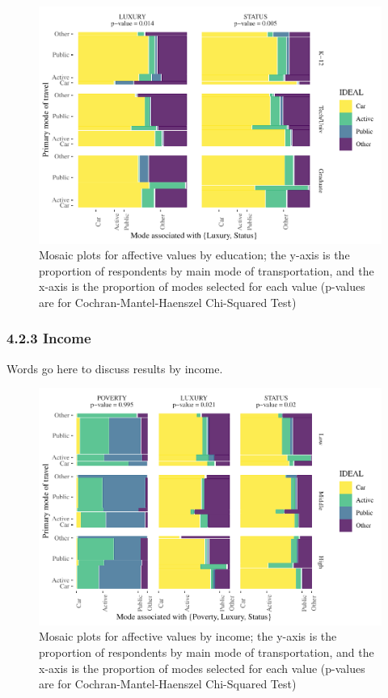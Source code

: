 \documentclass[]{elsarticle} %
\makeatletter
\def\maxwidth{\ifdim\Gin@nat@width>\linewidth\linewidth
\else\Gin@nat@width\fi}
\let\Oldincludegraphics\includegraphics
\renewcommand{\includegraphics}[1]{\Oldincludegraphics[width=\maxwidth]{#1}}
\makeatother
\begin{document}
\begin{figure}
\centering
\includegraphics{Dissonance_Santiago_v1_files/figure-latex/figure-mosaic-plots-by-attribute-and-education-1.pdf}
\caption{\label{fig:mosaic-plots-by-education}Mosaic plots for affective
values by education; the y-axis is the proportion of respondents by main
mode of transportation, and the x-axis is the proportion of modes
selected for each value (p-values are for Cochran-Mantel-Haenszel
Chi-Squared Test)}
\end{figure}

\hypertarget{income-1}{%
\subsubsection{4.2.3 Income}\label{income-1}}

Words go here to discuss results by income.

\begin{figure}
\centering
\includegraphics{Dissonance_Santiago_v1_files/figure-latex/figure-mosaic-plots-by-attribute-and-income-1.pdf}
\caption{\label{fig:mosaic-plots-by-income}Mosaic plots for affective
values by income; the y-axis is the proportion of respondents by main
mode of transportation, and the x-axis is the proportion of modes
selected for each value (p-values are for Cochran-Mantel-Haenszel
Chi-Squared Test)}
\end{figure}
\end{document}

